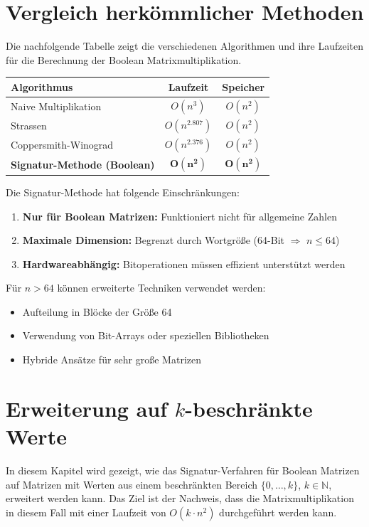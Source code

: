 ﻿\documentclass[a4paper,12pt]{article}
\theoremstyle{definition}
\begin{document}
\section{Vergleich herkömmlicher Methoden}
Die nachfolgende Tabelle zeigt die verschiedenen Algorithmen und ihre Laufzeiten für die Berechnung der Boolean Matrixmultiplikation.
\begin{center}
	\begin{tabular}{|l|c|c|}
		\hline
		\textbf{Algorithmus} & \textbf{Laufzeit} & \textbf{Speicher} \\
		\hline
		Naive Multiplikation & $O(n^3)$ & $O(n^2)$ \\
		Strassen & $O(n^{2.807})$ & $O(n^2)$ \\
		Coppersmith-Winograd & $O(n^{2.376})$ & $O(n^2)$ \\
		\hline
		\textbf{Signatur-Methode (Boolean)} & $\mathbf{O(n^2)}$ & $\mathbf{O(n^2)}$ \\
		\hline
	\end{tabular}
\end{center}
Die Signatur-Methode hat folgende Einschränkungen:

\begin{enumerate}
	\item \textbf{Nur für Boolean Matrizen:} Funktioniert nicht für allgemeine Zahlen
	\item \textbf{Maximale Dimension:} Begrenzt durch Wortgröße (64-Bit $\Rightarrow$ $n \leq 64$)
	\item \textbf{Hardwareabhängig:} Bitoperationen müssen effizient unterstützt werden
\end{enumerate}
Für $n > 64$ können erweiterte Techniken verwendet werden:
\begin{itemize}
	\item[-] Aufteilung in Blöcke der Größe 64
	\item[-] Verwendung von Bit-Arrays oder speziellen Bibliotheken
	\item[-] Hybride Ansätze für sehr große Matrizen
\end{itemize}

\section{Erweiterung auf $k$-beschränkte Werte}

In diesem Kapitel wird gezeigt, wie das Signatur-Verfahren für Boolean Matrizen auf Matrizen mit Werten aus einem beschränkten Bereich $\{0, \dots, k\}$, $k \in \mathbb{N}$, erweitert werden kann. Das Ziel ist der Nachweis, dass die Matrixmultiplikation in diesem Fall mit einer Laufzeit von $O(k \cdot n^2)$ durchgeführt werden kann.
\end{document}
